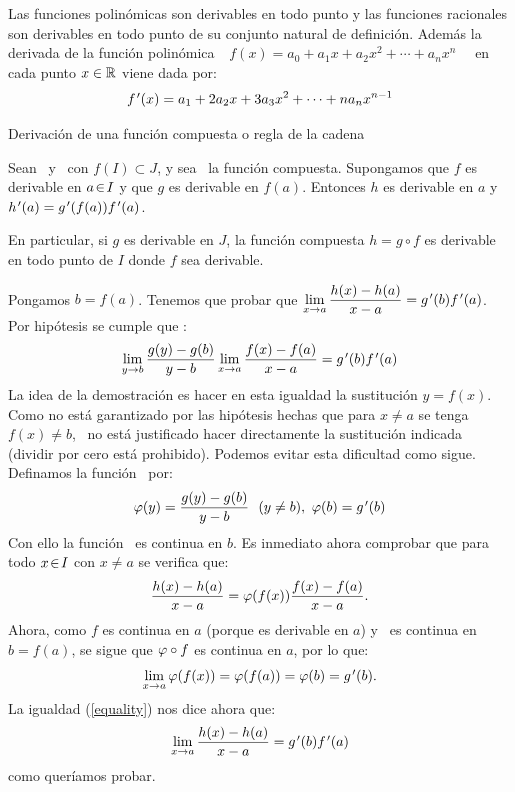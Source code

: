 \begin{coro}{}{} Las funciones polinómicas son derivables en todo
punto y las funciones racionales son derivables en todo punto de su
conjunto natural de definición. Además la derivada de la función polinómica
\mbox{%
$\ f(x)=a_{0}+a_{1}x+a_{2}x^{2}+\cdots+a_{n}x^{n}$\ %
} en cada punto $x\in\mathbb R$ viene dada por: 
\[
f\mbox{$^{\mspace{2mu}\prime}$}(x)=a_{1}+2a_{2}x+3a_{3}x^{2}+\cdots+na_{n}x^{n-1}
\]
\end{coro}

\begin{teo}{Derivación de una función compuesta o regla de la cadena}{}{}

Sean \ y \ con $f(I)\subset J$,
y sea \ la función compuesta. Supongamos
que $f$ es derivable en $a\!\in\! I$ y que $g$ es derivable en $f(a)$.
Entonces $h$ es derivable en $a$ y $h\mbox{$^{\mspace{2mu}\prime}$}(a)=g\mbox{$^{\mspace{2mu}\prime}$}(f(a))f\mbox{$^{\mspace{2mu}\prime}$}(a)$.

\noindent En particular, si $g$ es derivable en $J$, la función
compuesta $h=g\!\circ\!f$ es derivable en todo punto de $I$ donde
$f$ sea derivable. \end{teo}

\noindent \begin{prueba} Pongamos $b=f(a)$. Tenemos que probar que
$\displaystyle{\lim_{x\to a}\frac{h(x)-h(a)}{x-a}=g\mbox{$^{\mspace{2mu}\prime}$}(b)f\mbox{$^{\mspace{2mu}\prime}$}(a)}$. Por hipótesis
se cumple que :
\[
\lim_{y\to b}\frac{g(y)-g(b)}{y-b}\lim_{x\to a}\frac{f(x)-f(a)}{x-a}=g\mbox{$^{\mspace{2mu}\prime}$}(b)f\mbox{$^{\mspace{2mu}\prime}$}(a)
\]
La idea de la demostración es hacer en esta igualdad la sustitución
$y=f(x)$. Como no está garantizado por las hipótesis hechas que para
$x\neq a$ se tenga %
\mbox{%
$f(x)\neq b$,%
} no está justificado hacer directamente la sustitución indicada (dividir
por cero está prohibido). Podemos evitar esta dificultad como sigue.
Definamos la función \ por: 
\[
\ff(y)=\frac{g(y)-g(b)}{y-b}\ \ (y\neq b),\ \ff(b)=g\tl(b)
\]
Con ello la función \ff\ es continua en $b$. Es inmediato ahora
comprobar que para todo $x\!\in\! I$ con $x\neq a$ se verifica que:
\begin{equation}
\frac{h(x)-h(a)}{x-a}=\varphi(f(x))\frac{f(x)-f(a)}{x-a}.\label{equality}
\end{equation}
Ahora, como $f$ es continua en $a$ (porque es derivable en $a$)
y \ff\ es continua en $b=f(a)$, se sigue que $\varphi\circ f$ es continua
en $a$, por lo que: 
\[
\lim_{x\to a}\varphi(f(x))=\varphi(f(a))=\varphi(b)=g\mbox{$^{\mspace{2mu}\prime}$}(b).
\]
La igualdad (\ref{equality}) nos dice ahora que:
\[
\lim_{x\to a}\frac{h(x)-h(a)}{x-a}=g\mbox{$^{\mspace{2mu}\prime}$}(b)f\mbox{$^{\mspace{2mu}\prime}$}(a)
\]
como queríamos probar.\end{prueba}

